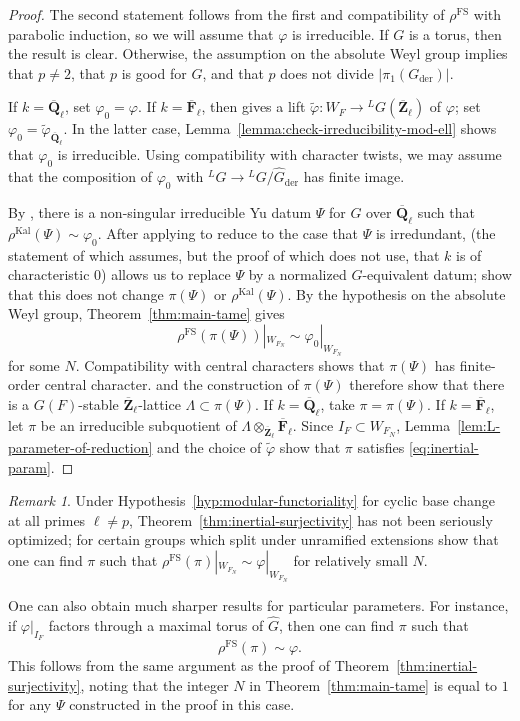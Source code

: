 \documentclass[reqno]{amsart}
\numberwithin{equation}{subsection}
\newcommand{\F}{\mathbf{F}}
\newcommand{\wt}[1]{\widetilde{#1}}
\newcommand{\Q}{\mathbf{Q}}
\newcommand{\Z}{\mathbf{Z}}
\newcommand{\ol}[1]{\overline{#1}}
\newcommand{\wh}[1]{\widehat{#1}}
\newcommand{\co}{\colon}
\newcommand{\ld}{{}^L}
\DeclareMathOperator{\FS}{FS}
\DeclareMathOperator{\Kal}{Kal}
\DeclareMathOperator{\der}{der}
\theoremstyle{remark}
\newtheorem{remark}[thm]{Remark}
\numberwithin{equation}{subsection}
\numberwithin{figure}{subsection}
\begin{document}
\begin{proof}
The second statement follows from the first and compatibility of $\rho^{\FS}$ with parabolic induction, so we will assume that $\varphi$ is irreducible. If $G$ is a torus, then the result is clear. Otherwise, the assumption on the absolute Weyl group implies that $p\neq2$, that $p$ is good for $G$, and that $p$ does not divide $|\pi_1(G_{\der})|$.

If $k=\ol\Q_\ell$, set $\varphi_0=\varphi$. If $k=\ol\F_\ell$, then \cite[Theorem 1.3, Theorem 1.6]{DHKM25} gives a lift $\wt\varphi\co W_F\to\ld G(\ol\Z_\ell)$ of $\varphi$; set $\varphi_0=\wt\varphi_{\ol\Q_\ell}$. In the latter case, Lemma~\ref{lemma:check-irreducibility-mod-ell} shows that $\varphi_0$ is irreducible. Using compatibility with character twists, we may assume that the composition of $\varphi_0$ with $\ld G\to\ld G/\wh G_{\der}$ has finite image.

By \cite[Lemma 4.1.3, Proposition 4.1.8, \S 4.2]{Kal21b}, there is a non-singular irreducible Yu datum $\Psi$ for $G$ over $\ol\Q_\ell$ such that $\rho^{\Kal}(\Psi)\sim\varphi_0$. After applying \cite[Lemma~6.6.1]{CF26a} to reduce to the case that $\Psi$ is irredundant, \cite[Lemma 3.7.2]{Kal19} (the statement of which assumes, but the proof of which does not use, that $k$ is of characteristic $0$) allows us to replace $\Psi$ by a normalized $G$-equivalent datum; \cite[Proposition~6.6.3 and Lemma~7.2.13]{CF26a} show that this does not change $\pi(\Psi)$ or $\rho^{\Kal}(\Psi)$. By the hypothesis on the absolute Weyl group, Theorem~\ref{thm:main-tame} gives
\[
\rho^{\FS}(\pi(\Psi))|_{W_{F_N}}\sim\varphi_0|_{W_{F_N}}
\]
for some $N$. Compatibility with central characters shows that $\pi(\Psi)$ has finite-order central character. \cite[Lemma~6.6.5]{CF26a} and the construction of $\pi(\Psi)$ therefore show that there is a $G(F)$-stable $\ol\Z_\ell$-lattice $\Lambda \subset \pi(\Psi)$. If $k=\ol\Q_\ell$, take $\pi=\pi(\Psi)$. If $k=\ol\F_\ell$, let $\pi$ be an irreducible subquotient of $\Lambda \otimes_{\ol\Z_\ell} \ol\F_\ell$. Since $I_F\subset W_{F_N}$, Lemma~\ref{lem:L-parameter-of-reduction} and the choice of $\wt\varphi$ show that $\pi$ satisfies \eqref{eq:inertial-param}.
\end{proof}

\begin{remark}
Under Hypothesis~\ref{hyp:modular-functoriality} for cyclic base change at all primes $\ell \neq p$, Theorem~\ref{thm:inertial-surjectivity} has not been seriously optimized; for certain groups which split under unramified extensions \cite[Examples~10.2.6 and 10.2.8]{CF26a} show that one can find $\pi$ such that $\rho^{\FS}(\pi)|_{W_{F_N}} \sim \varphi|_{W_{F_N}}$ for relatively small $N$.

One can also obtain much sharper results for particular parameters. For instance, if $\varphi|_{I_F}$ factors through a maximal torus of $\wh G$, then one can find $\pi$ such that
\[
\rho^{\FS}(\pi) \sim \varphi.
\]
This follows from the same argument as the proof of Theorem~\ref{thm:inertial-surjectivity}, noting that the integer $N$ in Theorem~\ref{thm:main-tame} is equal to $1$ for any $\Psi$ constructed in the proof in this case.
\end{remark}
\end{document}
